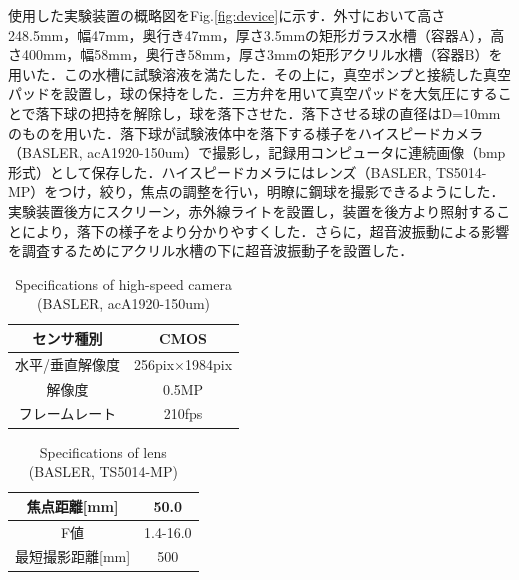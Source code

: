 使用した実験装置の概略図をFig.\ref{fig:device}に示す．外寸において高さ248.5mm，幅47mm，奥行き47mm，厚さ3.5mmの矩形ガラス水槽（容器A），高さ400mm，幅58mm，奥行き58mm，厚さ3mmの矩形アクリル水槽（容器B）を用いた．この水槽に試験溶液を満たした．その上に，真空ポンプと接続した真空パッドを設置し，球の保持をした．三方弁を用いて真空パッドを大気圧にすることで落下球の把持を解除し，球を落下させた．落下させる球の直径はD=10mmのものを用いた．落下球が試験液体中を落下する様子をハイスピードカメラ（BASLER, acA1920-150um）で撮影し，記録用コンピュータに連続画像（bmp形式）として保存した．ハイスピードカメラにはレンズ（BASLER, TS5014-MP）をつけ，絞り，焦点の調整を行い，明瞭に鋼球を撮影できるようにした．実験装置後方にスクリーン，赤外線ライトを設置し，装置を後方より照射することにより，落下の様子をより分かりやすくした．さらに，超音波振動による影響を調査するためにアクリル水槽の下に超音波振動子を設置した．

\begin{table}[ht]
    \centering
    \caption{Specifications of high-speed camera (BASLER, acA1920-150um)}
    \label{table:camera}
    \begin{tabular}{c|c}\hline
        センサ種別      & CMOS                  \\ \hline
        水平/垂直解像度 & 256pix$\times$1984pix \\ \hline
        解像度          & 0.5MP                 \\ \hline
        フレームレート  & 210fps                \\ \hline
    \end{tabular}
\end{table}

\begin{table}[ht]
    \centering
    \caption{Specifications of lens (BASLER, TS5014-MP)}
    \label{table:lens}
    \begin{tabular}{c|c}\hline
        焦点距離[mm]     & 50.0     \\ \hline
        F値              & 1.4-16.0 \\ \hline
        最短撮影距離[mm] & 500      \\ \hline
    \end{tabular}
\end{table}

